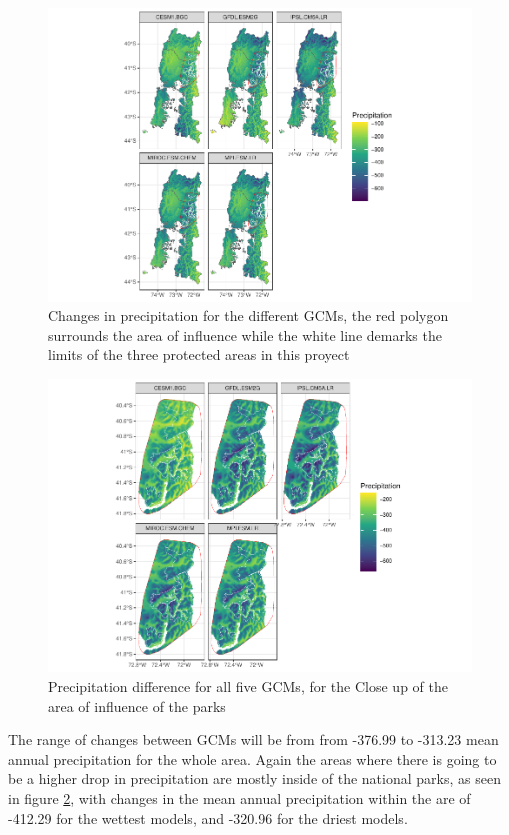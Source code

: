 \documentclass[]{article}
\begin{document}
\begin{figure}
\centering
\includegraphics{Review_and_climate_files/figure-latex/DifPrec-1.pdf}
\caption{\label{fig:DifPrec}Changes in precipitation for the different GCMs, the red polygon surrounds the area of influence while the white line demarks the limits of the three protected areas in this proyect}
\end{figure}

\begin{figure}
\centering
\includegraphics{Review_and_climate_files/figure-latex/DifPrecHull-1.pdf}
\caption{\label{fig:DifPrecHull}Precipitation difference for all five GCMs, for the Close up of the area of influence of the parks}
\end{figure}

The range of changes between GCMs will be from from -376.99 to -313.23 mean annual precipitation for the whole area. Again the areas where there is going to be a higher drop in precipitation are mostly inside of the national parks, as seen in figure \ref{fig:DifPrecHull}, with changes in the mean annual precipitation within the are of -412.29 for the wettest models, and -320.96 for the driest models.

\renewcommand\refname{Vegetational formation}

\end{document}
